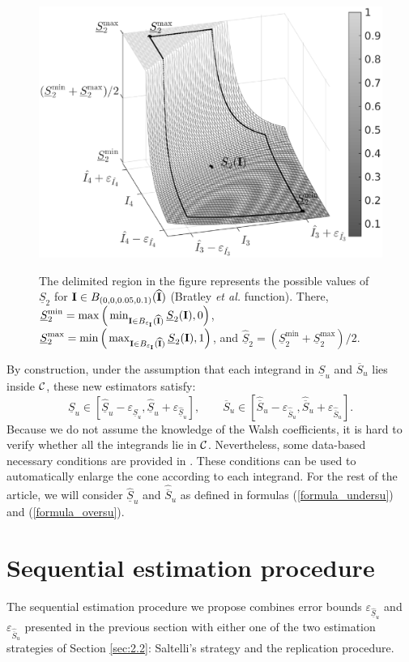 \begin{figure}[t]
\caption{The delimited region in the figure represents the possible values of $\underline{S}_2$ for $\boldsymbol{\mathbf{I}}\in B_{(0,0,0.05,0.1)}(\widehat{\boldsymbol{\mathbf{I}}})$ (Bratley \textit{et al.} function). There, $\underline{S}_2^{\min}=\max\Big{(}\min_{\boldsymbol{\mathbf{I}}\in B_{\varepsilon_{\boldsymbol{\mathbf{I}}}}(\widehat{\boldsymbol{\mathbf{I}}})} \underline{S}_2(\boldsymbol{\mathbf{I}}),0\Big{)}$, $\underline{S}_2^{\max}=\min\Big{(}\max_{\boldsymbol{\mathbf{I}}\in B_{\varepsilon_{\boldsymbol{\mathbf{I}}}}(\widehat{\boldsymbol{\mathbf{I}}})} \underline{S}_2(\boldsymbol{\mathbf{I}}),1\Big{)}$, and $\widehat{\underline{S}}_2=(\underline{S}_2^{\min}+\underline{S}_2^{\max})/2$.}
\centering
\includegraphics[width=.45\textwidth]{estimator_3d_small.eps}
\label{fig:1}       %
\end{figure}

By construction, under the assumption that each integrand in $\underline{S}_u$ and $\overline{S}_u$ lies inside $\mathcal{C}$, these new estimators satisfy: \[ \underline{S}_u\in \left[ \widehat{\underline{S}}_u - \varepsilon_{\widehat{\underline{S}}_u}, \widehat{\underline{S}}_u + \varepsilon_{\widehat{\underline{S}}_u} \right], \qquad \overline{S}_u\in \left[ \widehat{\overline{S}}_u - \varepsilon_{\widehat{\overline{S}}_u}, \widehat{\overline{S}}_u + \varepsilon_{\widehat{\overline{S}}_u} \right] .\]
Because we do not assume the knowledge of the Walsh coefficients, it is hard to verify whether all the integrands lie in $\mathcal{C}$. Nevertheless, some data-based necessary conditions are provided in \cite{HicJimLi}. These conditions can be used to automatically enlarge the cone according to each integrand. For the rest of the article, we will consider $\widehat{\underline{S}}_u$ and $\widehat{\overline{S}}_u$ as defined in formulas (\ref{formula_undersu}) and (\ref{formula_oversu}).

\section{Sequential estimation procedure}
\label{sec:4}
The sequential estimation procedure we propose combines error bounds $\varepsilon_{\widehat{\underline{S}}_u}$ and $\varepsilon_{\widehat{\overline{S}}_u}$ presented in the previous section with either one of the two estimation strategies of Section \ref{sec:2.2}: Saltelli's strategy and the replication procedure. 

